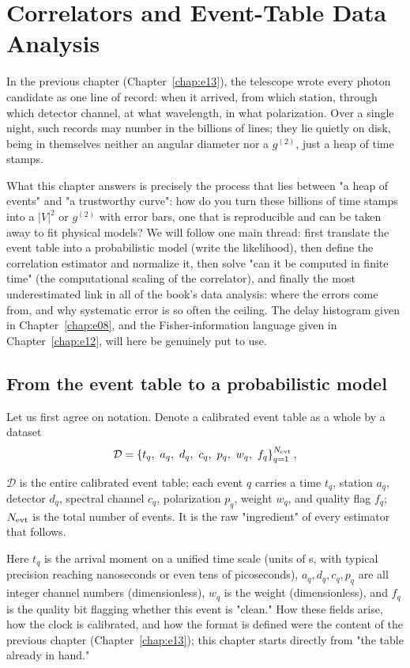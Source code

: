\chapter{Correlators and Event-Table Data Analysis}
\label{chap:e14}

\begin{chapteropening}
In the previous chapter (Chapter~\ref{chap:e13}), the telescope wrote every photon candidate as one line of record: when it arrived, from which station, through which detector channel, at what wavelength, in what polarization. Over a single night, such records may number in the billions of lines; they lie quietly on disk, being in themselves neither an angular diameter nor a $g^{(2)}$, just a heap of time stamps.

What this chapter answers is precisely the process that lies between "a heap of events" and "a trustworthy curve": how do you turn these billions of time stamps into a $|V|^2$ or $g^{(2)}$ with error bars, one that is reproducible and can be taken away to fit physical models? We will follow one main thread: first translate the event table into a probabilistic model (write the likelihood), then define the correlation estimator and normalize it, then solve "can it be computed in finite time" (the computational scaling of the correlator), and finally the most underestimated link in all of the book's data analysis: where the errors come from, and why systematic error is so often the ceiling. The delay histogram given in Chapter~\ref{chap:e08}, and the Fisher-information language given in Chapter~\ref{chap:e12}, will here be genuinely put to use.
\end{chapteropening}

\section{From the event table to a probabilistic model}
\label{sec:e14-model}

Let us first agree on notation. Denote a calibrated event table as a whole by a dataset
\begin{equation}
  \mathcal{D}
  =
  \left\{
  t_q,\ a_q,\ d_q,\ c_q,\ p_q,\ w_q,\ f_q
  \right\}_{q=1}^{N_{\rm evt}} ,
  \label{eq:e14-data}
\end{equation}
\begin{formulaexplain}
$\mathcal D$ is the entire calibrated event table; each event $q$ carries a time $t_q$, station $a_q$, detector $d_q$, spectral channel $c_q$, polarization $p_q$, weight $w_q$, and quality flag $f_q$; $N_{\rm evt}$ is the total number of events. It is the raw "ingredient" of every estimator that follows.
\end{formulaexplain}
Here $t_q$ is the arrival moment on a unified time scale (units of s, with typical precision reaching nanoseconds or even tens of picoseconds), $a_q,d_q,c_q,p_q$ are all integer channel numbers (dimensionless), $w_q$ is the weight (dimensionless), and $f_q$ is the quality bit flagging whether this event is "clean." How these fields arise, how the clock is calibrated, and how the format is defined were the content of the previous chapter (Chapter~\ref{chap:e13}); this chapter starts directly from "the table already in hand."

